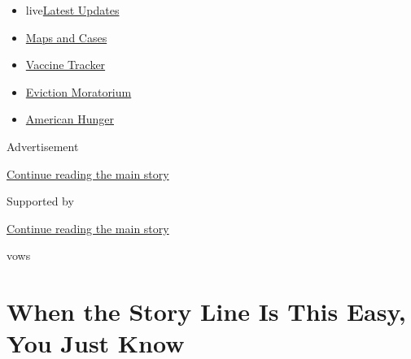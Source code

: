 \begin{itemize}
\tightlist
\item
  live\href{https://www.nytimes3xbfgragh.onion/2020/09/09/world/covid-19-coronavirus.html?name=styln-coronavirus-national\&region=TOP_BANNER\&block=storyline_menu_recirc\&action=click\&pgtype=Article\&impression_id=39088511-f295-11ea-9b1f-ab8611e6ed59\&variant=undefined}{Latest
  Updates}
\item
  \href{https://www.nytimes3xbfgragh.onion/interactive/2020/us/coronavirus-us-cases.html?name=styln-coronavirus-national\&region=TOP_BANNER\&block=storyline_menu_recirc\&action=click\&pgtype=Article\&impression_id=3908ac20-f295-11ea-9b1f-ab8611e6ed59\&variant=undefined}{Maps
  and Cases}
\item
  \href{https://www.nytimes3xbfgragh.onion/interactive/2020/science/coronavirus-vaccine-tracker.html?name=styln-coronavirus-national\&region=TOP_BANNER\&block=storyline_menu_recirc\&action=click\&pgtype=Article\&impression_id=3908ac21-f295-11ea-9b1f-ab8611e6ed59\&variant=undefined}{Vaccine
  Tracker}
\item
  \href{https://www.nytimes3xbfgragh.onion/2020/09/02/your-money/eviction-moratorium-covid.html?name=styln-coronavirus-national\&region=TOP_BANNER\&block=storyline_menu_recirc\&action=click\&pgtype=Article\&impression_id=3908ac22-f295-11ea-9b1f-ab8611e6ed59\&variant=undefined}{Eviction
  Moratorium}
\item
  \href{https://www.nytimes3xbfgragh.onion/interactive/2020/09/02/magazine/food-insecurity-hunger-us.html?name=styln-coronavirus-national\&region=TOP_BANNER\&block=storyline_menu_recirc\&action=click\&pgtype=Article\&impression_id=3908ac23-f295-11ea-9b1f-ab8611e6ed59\&variant=undefined}{American
  Hunger}
\end{itemize}

Advertisement

\protect\hyperlink{after-top}{Continue reading the main story}

Supported by

\protect\hyperlink{after-sponsor}{Continue reading the main story}

vows

\hypertarget{when-the-story-line-is-this-easy-you-just-know}{%
\section{When the Story Line Is This Easy, You Just
Know}\label{when-the-story-line-is-this-easy-you-just-know}}


